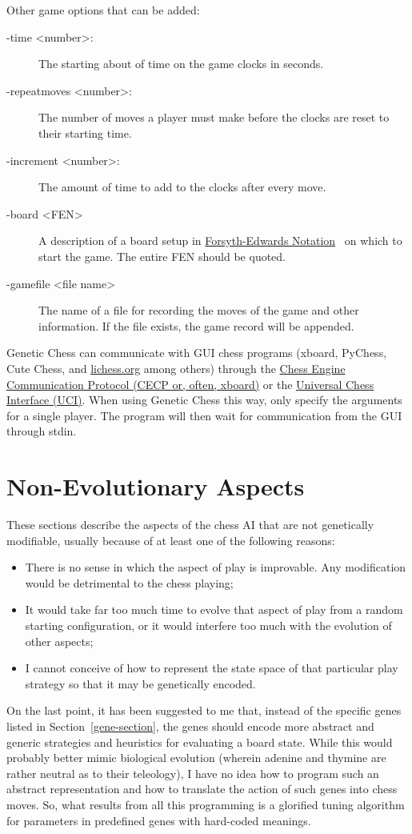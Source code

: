 \documentclass[letterpaper]{article}
\newcommand{\code}[1]{\small\textsf{#1}}
\renewcommand{\_}{\allowbreak\textunderscore\allowbreak}
\begin{document}
Other game options that can be added:
\begin{description}
	\item[\code{-time <number>}:] The starting about of time on the game clocks in seconds.
	\item[\code{-repeat\_moves <number>}:] The number of moves a player must make before the clocks are reset to their starting time.
	\item[\code{-increment <number>}:] The amount of time to add to the clocks after every move.
	\item[\code{-board <FEN>}] A description of a board setup in \href{https://en.wikipedia.org/wiki/Forsyth\%E2\%80\%93Edwards_Notation}{Forsyth-Edwards Notation}~\cite{fen-notation} on which to start the game. The entire FEN should be quoted.
	\item[\code{-game\_file <file name>}] The name of a file for recording the moves of the game and other information. If the file exists, the game record will be appended.
\end{description}
Genetic Chess can communicate with GUI chess programs (xboard, PyChess, Cute Chess, and \href{https://lichess.org}{lichess.org} among others) through the \href{https://www.gnu.org/software/xboard/engine-intf.html}{Chess Engine Communication Protocol (CECP or, often, xboard)} or the \href{http://wbec-ridderkerk.nl/html/UCIProtocol.html}{Universal Chess Interface (UCI)}. When using Genetic Chess this way, only specify the arguments for a single player. The program will then wait for communication from the GUI through stdin.


\section{Non-Evolutionary Aspects}

These sections describe the aspects of the chess AI that are not genetically modifiable, usually because of at least one of the following reasons:
\begin{itemize}
	\item There is no sense in which the aspect of play is improvable. Any modification would be detrimental to the chess playing;
	\item It would take far too much time to evolve that aspect of play from a random starting configuration, or it would interfere too much with the evolution of other aspects;
	\item I cannot conceive of how to represent the state space of that particular play strategy so that it may be genetically encoded.
\end{itemize}
On the last point, it has been suggested to me that, instead of the specific genes listed in Section~\ref{gene-section}, the genes should encode more abstract and generic strategies and heuristics for evaluating a board state. While this would probably better mimic biological evolution (wherein adenine and thymine are rather neutral as to their teleology), I have no idea how to program such an abstract representation and how to translate the action of such genes into chess moves. So, what results from all this programming is a glorified tuning algorithm for parameters in predefined genes with hard-coded meanings.
\end{document}
